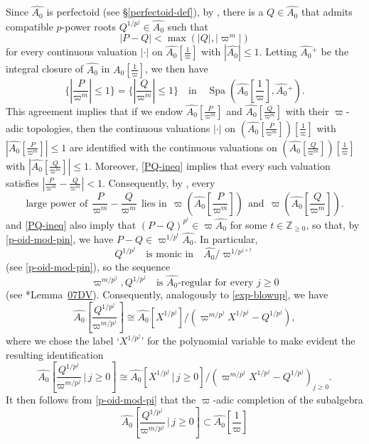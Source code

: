 \documentclass[11pt, reqno]{amsart}
\newcommand{\bZ}{\mathbb{Z}}
\DeclareMathOperator{\Spa}{Spa}		%
\newcommand{\wh}{\widehat}
\providecommand{\abs}[1]{\left\lvert#1\right\rvert}
\providecommand{\f}[2]{\frac{#1}{#2}}
\newcommand{\lab}{\label}
\newcommand{\x}{\text}
\providecommand{\qxq}[1]{\quad\text{#1}\quad}
\newcommand{\q}{\quad}
\newcommand{\tst}{\textstyle}
\newcommand{\be}{\begin{equation}}
\newcommand{\ee}{\end{equation}}
\numberwithin{equation}{numberingbase}
\theoremstyle{thms}
\theoremstyle{claims}
\theoremstyle{defs}
\theoremstyle{thms}
\theoremstyle{defs}
\theoremstyle{subsection-tweak}
\theoremstyle{subsection-tweak}
\begin{document}
Since $\wh{A_0}$ is perfectoid (see \S\ref{perfectoid-def}), by , there is a $Q \in \wh{A_0}$ that admits compatible $p$-power roots $Q^{1/p^j} \in \wh{A_0}$ such that
\be \label{PQ-ineq}
\tst \abs{P - Q} < \max(|Q|, | \varpi^m |)
\ee 
for every continuous valuation $\abs{\cdot}$ on $\wh{A_0}[\f{1}{\varpi}]$ with $| \wh{A_0} | \le 1$. 
Letting %
$\wh{A_0}{}^+$ be the integral closure of %
$\wh{A_0}$ in %
$\wh{A_0}[\f{1}{\varpi}]$, we then have
\[
\tst \{ \abs{\f{P}{\varpi^m}} \le 1 \} = \{ |\f{Q}{\varpi^m}| \le 1 \} \q \x{in} \q \Spa(\wh{A_0}[\f{1}{\varpi}], \wh{A_0}{}^+). %
\]
This agreement implies that if we endow $\wh{A_0}[\f{P}{\varpi^m}]$ and $\wh{A_0}[\f{Q}{\varpi^m}]$ with their $\varpi$-adic topologies, then the continuous valuations $\abs{\cdot}$ on $(\wh{A_0}[\f{P}{\varpi^m}])[\f{1}{\varpi}]$ with $ | \wh{A_0}[\f{P}{\varpi^m}] | \le 1$ are identified with the continuous valuations on $(\wh{A_0}[\f{Q}{\varpi^m}])[\f{1}{\varpi}]$ with $ | \wh{A_0}[\f{Q}{\varpi^m}] | \le 1$. Moreover, \eqref{PQ-ineq} implies that every such valuation satisfies $| \f{P}{\varpi^m} - \f{Q}{\varpi^m} | < 1$. Consequently, by , every
\be \label{PQ-power}
\tst \x{large power of} \ \ \f{P}{\varpi^m} - \f{Q}{\varpi^m} \ \ \x{lies in} \ \ \varpi(\wh{A_0}[\f{P}{\varpi^m}]) \ \  \x{and} \ \ \varpi(\wh{A_0}[\f{Q}{\varpi^m}]).
\ee
{} and \eqref{PQ-ineq} also imply that $(P - Q)^{p^t} \in \varpi\wh{A_0}$ for some $t \in \bZ_{\ge 0}$, so that, by \eqref{p-oid-mod-pin}, we have $P - Q \in \varpi^{1/p^t}\wh{A_0}$. In particular, 
\be \lab{Qpj-monic}
Q^{1/p^j} \qxq{is monic in} \wh{A_0}/\varpi^{1/p^{j + t}}
\ee
(see \eqref{p-oid-mod-pin}), so the sequence 
\be \label{piQ-regseq}
\varpi^{m/p^{j}}, Q^{1/p^j} \q \x{is $\wh{A_0}$-regular for every $j \ge 0$}
\ee
(see \cite{SP}*{Lemma~\href{https://stacks.math.columbia.edu/tag/07DV}{07DV}}). Consequently, analogously to \eqref{exp-blowup}, we have 
\be \label{exp-blowup-2}
\tst \wh{A_0}[\f{Q^{1/p^j}}{\varpi^{m/p^{j}}}] \cong \wh{A_0}[X^{1/p^j}]/(\varpi^{m/p^j} X^{1/p^j} - Q^{1/p^j}),
\ee
where we chose the label `$X^{1/p^j}$' for the polynomial variable to make evident the resulting identification
\be \label{hat-id}
\tst \wh{A_0}[\f{Q^{1/p^j}}{\varpi^{m/p^{j}}}\, |\, j \ge 0] \cong \wh{A_0}[X^{1/p^j}\, | \, j \ge 0]/(\varpi^{m/p^j} X^{1/p^j} - Q^{1/p^j})_{j \ge 0}.
\ee
It then follows from \eqref{p-oid-mod-pi} that the $\varpi$-adic completion of the subalgebra 
\[
\tst \wh{A_0}[\f{Q^{1/p^j}}{\varpi^{m/p^{j}}}\, |\, j \ge 0] \subset \wh{A_0}[\f{1}{\varpi}]
\]
\end{document}
